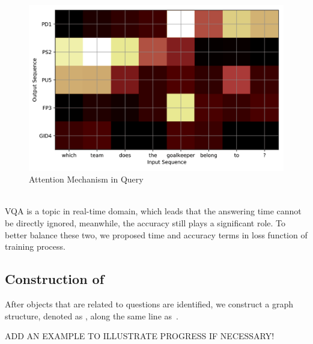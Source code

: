 \begin{figure}[h]
\begin{center}
\includegraphics[width=\linewidth]{figure/question.png}
\end{center}
\caption{Attention Mechanism in Query}
\label{fig:Attention}
\end{figure}


\\
VQA is a topic in real-time domain, which leads that the answering time cannot be directly ignored, meanwhile, the accuracy still plays a significant role. To better balance these two, we proposed time and accuracy terms in loss function of training process.


\subsection{Construction of }
\label{sec-eag-construction}

After objects that are related to questions are identified, we construct a graph structure, denoted as , along the same line as~\cite{peixi2019}. 


\begin{example}
\label{exm-x1}
ADD AN EXAMPLE TO ILLUSTRATE PROGRESS IF NECESSARY!
\end{example}
